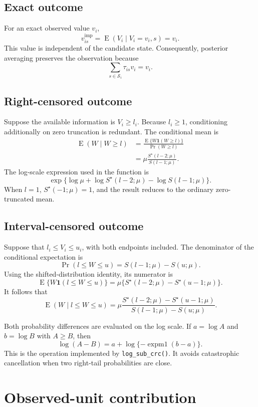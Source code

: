 \documentclass[11pt,a4paper]{article}
\begin{document}
\subsection{Exact outcome}

For an exact observed value $v_i$,
\[
  v_{is}^{\mathrm{imp}}
  =\operatorname{E}(V_i\mid V_i=v_i,s)
  =v_i.
\]
This value is independent of the candidate state. Consequently, posterior
averaging preserves the observation because
\[
  \sum_{s\in\mathcal S_i}\tau_{is}v_i=v_i.
\]

\subsection{Right-censored outcome}

Suppose the available information is $V_i\geq l_i$. Because $l_i\geq1$,
conditioning additionally on zero truncation is redundant. The conditional
mean is
\begin{align*}
  \operatorname{E}(W\mid W\geq l)
  &=\frac{\operatorname{E}\{W\mathbf 1(W\geq l)\}}
          {\Pr(W\geq l)}\\
  &=\mu\frac{S^\star(l-2;\mu)}{S(l-1;\mu)}.
\end{align*}
The log-scale expression used in the function is
\[
  \exp\{\log\mu+\log S^\star(l-2;\mu)-\log S(l-1;\mu)\}.
\]
When $l=1$, $S^\star(-1;\mu)=1$, and the result reduces to the ordinary
zero-truncated mean.

\subsection{Interval-censored outcome}

Suppose that $l_i\leq V_i\leq u_i$, with both endpoints included. The
denominator of the conditional expectation is
\[
  \Pr(l\leq W\leq u)
  =S(l-1;\mu)-S(u;\mu).
\]
Using the shifted-distribution identity, its numerator is
\[
  \operatorname{E}\{W\mathbf 1(l\leq W\leq u)\}
  =\mu\{S^\star(l-2;\mu)-S^\star(u-1;\mu)\}.
\]
It follows that
\[
  \operatorname{E}(W\mid l\leq W\leq u)
  =\mu
   \frac{S^\star(l-2;\mu)-S^\star(u-1;\mu)}
        {S(l-1;\mu)-S(u;\mu)}.
\]

Both probability differences are evaluated on the log scale. If
$a=\log A$ and $b=\log B$ with $A\geq B$, then
\[
  \log(A-B)=a+\log\{-\operatorname{expm1}(b-a)\}.
\]
This is the operation implemented by \texttt{log\_sub\_crc()}. It avoids
catastrophic cancellation when two right-tail probabilities are close.

\section{Observed-unit contribution}
\end{document}
